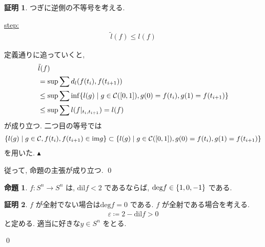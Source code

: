 \documentclass[10pt, fleqn, label-section=none]{bxjsarticle}
\theoremstyle{definition}
\newtheorem{prop}[dfn]{命題}
\newtheorem*{pf*}{証明}
\newcommand{\veps}{\varepsilon}
\newcommand{\cbra}[1]{\mleft\{#1\mright\}}
\newcommand{\dil}{\textrm{dil}}
\renewcommand{\;}{\, ; \,}
\newenvironment{claim}[1]{\par\noindent\underline{step:}\space#1}{}
\newenvironment{claimproof}[1]{\par\noindent{($\because$)}\space#1}{\hfill $\blacktriangle $}
\begin{document}
\begin{pf*}
つぎに逆側の不等号を考える.
\begin{claim}
\begin{align*} \tilde l (f) \leq l (f)  \end{align*}
\end{claim}
\begin{claimproof}
定義通りに追っていくと, 
\begin{align*}
&\tilde l (f) \\
&=  \sup \sum d_l (f(t_i), f(t_{i+1} ))   \\
&\leq \sup \sum \inf \cbra{l (g) \mid g \in \mathcal C([0,1]), g(0) = f(t_{i}), g(1) = f(t_{i+1})} \\
&\leq \sup \sum l(f |_{t_i, t_{i+1}}) = l(f) \end{align*}
が成り立つ. 二つ目の等号では
\begin{align*} \cbra{l (g) \mid g \in \mathcal C, f(t_{i}), f(t_{i+1}) \in \textrm{im} g }  \subset \cbra{l (g) \mid g \in \mathcal C([0,1]), g(0) = f(t_{i}), g(1) = f(t_{i+1})}   \end{align*}
を用いた. 
\end{claimproof}

従って, 命題の主張が成り立つ. 
\qed
\end{pf*}



\begin{prop}
$f: S^n \rightarrow S^n$ は, $\dil f < 2$ であるならば, $\textrm{deg} f \in \cbra{1, 0, -1}$ である.
\end{prop}
\begin{pf*}
$f$ が全射でない場合は$\textrm{deg} f = 0$ である. $f$ が全射である場合を考える. 
\begin{align*} \veps \coloneqq  2 - \dil f > 0 \end{align*}
と定める. 適当に好きな$y \in S^n$ をとる. 



\qed
\end{pf*}
\end{document}
